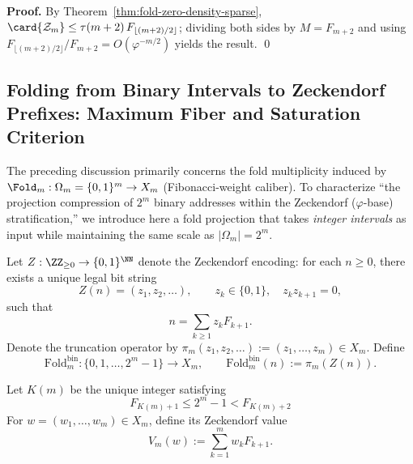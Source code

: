 \textbf{Proof.}
By Theorem~\ref{thm:fold-zero-density-sparse}, \(\card{\mathcal{Z}_m}\le \tau(m+2)\,F_{\lfloor (m+2)/2\rfloor}\); dividing both sides by \(M=F_{m+2}\) and using \(F_{\lfloor (m+2)/2\rfloor}/F_{m+2}=O(\varphi^{-m/2})\) yields the result. \qed



\subsection{Folding from Binary Intervals to Zeckendorf Prefixes: Maximum Fiber and Saturation Criterion}\label{app:fold-binary-prefix}

The preceding discussion primarily concerns the fold multiplicity induced by \(\Fold_m:\Omega_m=\{0,1\}^m\to X_m\) (Fibonacci-weight caliber).
To characterize ``the projection compression of \(2^m\) binary addresses within the Zeckendorf (\(\varphi\)-base) stratification,'' we introduce here a fold projection that takes \emph{integer intervals} as input while maintaining the same scale as \(|\Omega_m|=2^m\).

\begin{definition}\label{def:fold-bin}
Let \(Z:\ZZ_{\ge 0}\to\{0,1\}^{\NN}\) denote the Zeckendorf encoding: for each \(n\ge 0\), there exists a unique legal bit string
\[
Z(n)=(z_1,z_2,\dots),\qquad z_k\in\{0,1\},\quad z_k z_{k+1}=0,
\]
such that
\[
n=\sum_{k\ge 1} z_k F_{k+1}.
\]
Denote the truncation operator by \(\pi_m(z_1,z_2,\dots):=(z_1,\dots,z_m)\in X_m\). Define
\[
\mathrm{Fold}^{\mathrm{bin}}_m:\{0,1,\dots,2^m-1\}\to X_m,\qquad
\mathrm{Fold}^{\mathrm{bin}}_m(n):=\pi_m(Z(n)).
\]
\end{definition}

\begin{definition}\label{def:K-of-m}
Let \(K(m)\) be the unique integer satisfying
\begin{equation}\label{eq:K-of-m}
F_{K(m)+1}\le 2^m-1 < F_{K(m)+2}
\end{equation}
For \(w=(w_1,\dots,w_m)\in X_m\), define its Zeckendorf value
\[
V_m(w):=\sum_{k=1}^m w_k F_{k+1}.
\]
\end{definition}

